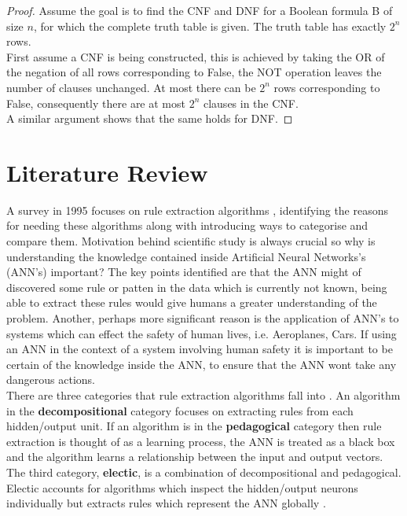 \begin{proof}
	Assume the goal is to find the CNF and DNF for a Boolean formula B of size $n$, for which the complete truth table is given. The truth table has exactly $2^n$ rows.\\
	
	First assume a CNF is being constructed, this is achieved by taking the OR of the negation of all rows corresponding to False, the NOT operation leaves the number of clauses unchanged. At most there can be $2^n$ rows corresponding to False, consequently there are at most $2^n$ clauses in the CNF.\\
	
	A similar argument shows that the same holds for DNF.
\end{proof}

\section{Literature Review}

A survey in 1995 focuses on rule extraction algorithms \cite{andrews1995survey}, identifying the reasons for needing these algorithms along with introducing ways to categorise and compare them. Motivation behind scientific study is always crucial so why is understanding the knowledge contained inside Artificial Neural Networks's (ANN's) important? The key points identified are that the ANN might of discovered some rule or patten in the data which is currently not known, being able to extract these rules would give humans a greater understanding of the problem. Another, perhaps more significant reason is the application of ANN's to systems which can effect the safety of human lives, i.e. Aeroplanes, Cars. If using an ANN in the context of a system involving human safety it is important to be certain of the knowledge inside the ANN, to ensure that the ANN wont take any dangerous actions.\\

There are three categories that rule extraction algorithms fall into \cite{andrews1995survey}. An algorithm in the \textbf{decompositional} category focuses on extracting rules from each hidden/output unit. If an algorithm is in the \textbf{pedagogical} category then rule extraction is thought of as a learning process, the ANN is treated as a black box and the algorithm learns a relationship between the input and output vectors. The third category, \textbf{electic}, is a combination of decompositional and pedagogical. Electic accounts for algorithms which inspect the hidden/output neurons individually but extracts rules which represent the ANN globally \cite{tickle1998truth}.\\

